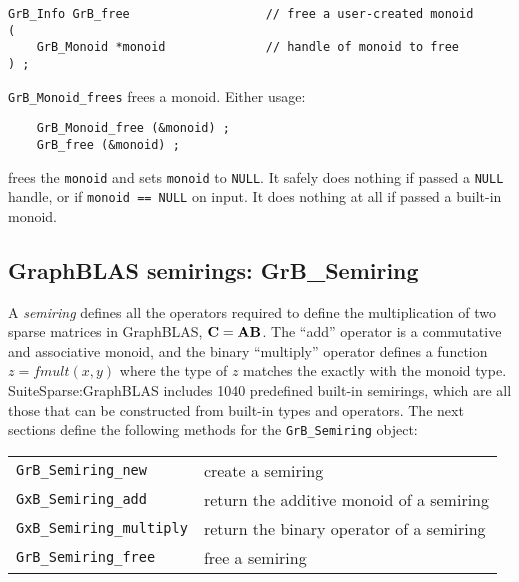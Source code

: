 \documentclass[12pt]{article}
\begin{document}
\begin{mdframed}[userdefinedwidth=6in]
{\footnotesize
\begin{verbatim}
GrB_Info GrB_free                   // free a user-created monoid
(
    GrB_Monoid *monoid              // handle of monoid to free
) ;
\end{verbatim}
} \end{mdframed}

\verb'GrB_Monoid_frees' frees a monoid.  Either usage:

    {\small
    \begin{verbatim}
    GrB_Monoid_free (&monoid) ;
    GrB_free (&monoid) ; \end{verbatim}}

\noindent
frees the \verb'monoid' and sets \verb'monoid' to \verb'NULL'.  It safely does
nothing if passed a \verb'NULL' handle, or if \verb'monoid == NULL' on input.
It does nothing at all if passed a built-in monoid.

\newpage
\subsection{GraphBLAS semirings: {\sf GrB\_Semiring}} %
\label{semiring}

A {\em semiring} defines all the operators required to define the
multiplication of two sparse matrices in GraphBLAS, ${\bf C=AB}$.  The ``add''
operator is a commutative and associative monoid, and the binary ``multiply''
operator defines a function $z=fmult(x,y)$ where the type of $z$ matches the
exactly with the monoid type.  SuiteSparse:GraphBLAS includes 1040
predefined built-in semirings, which are all those that can be constructed
from built-in types and operators.  The next sections define the following
methods for the \verb'GrB_Semiring' object:

\vspace{0.2in}
{\footnotesize
\begin{tabular}{ll}
\hline
\verb'GrB_Semiring_new'       & create a semiring \\
\verb'GxB_Semiring_add'       & return the additive monoid of a semiring \\
\verb'GxB_Semiring_multiply'  & return the binary operator of a semiring \\
\verb'GrB_Semiring_free'      & free a semiring \\
\hline
\end{tabular}
}
\end{document}
